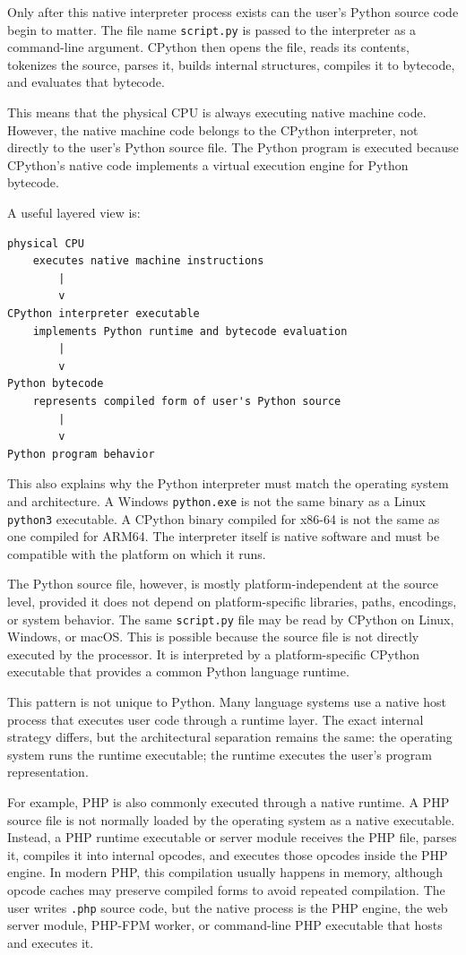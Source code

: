 \documentclass[a4paper,twoside]{report}
\begin{document}
Only after this native interpreter process exists can the user's Python source code begin to matter. The file name \texttt{script.py} is passed to the interpreter as a command-line argument. CPython then opens the file, reads its contents, tokenizes the source, parses it, builds internal structures, compiles it to bytecode, and evaluates that bytecode.

This means that the physical CPU is always executing native machine code. However, the native machine code belongs to the CPython interpreter, not directly to the user's Python source file. The Python program is executed because CPython's native code implements a virtual execution engine for Python bytecode.

A useful layered view is:

\begin{verbatim}
physical CPU
    executes native machine instructions
        |
        v
CPython interpreter executable
    implements Python runtime and bytecode evaluation
        |
        v
Python bytecode
    represents compiled form of user's Python source
        |
        v
Python program behavior
\end{verbatim}

This also explains why the Python interpreter must match the operating system and architecture. A Windows \texttt{python.exe} is not the same binary as a Linux \texttt{python3} executable. A CPython binary compiled for x86-64 is not the same as one compiled for ARM64. The interpreter itself is native software and must be compatible with the platform on which it runs.

The Python source file, however, is mostly platform-independent at the source level, provided it does not depend on platform-specific libraries, paths, encodings, or system behavior. The same \texttt{script.py} file may be read by CPython on Linux, Windows, or macOS. This is possible because the source file is not directly executed by the processor. It is interpreted by a platform-specific CPython executable that provides a common Python language runtime.

This pattern is not unique to Python. Many language systems use a native host process that executes user code through a runtime layer. The exact internal strategy differs, but the architectural separation remains the same: the operating system runs the runtime executable; the runtime executes the user's program representation.

For example, PHP is also commonly executed through a native runtime. A PHP source file is not normally loaded by the operating system as a native executable. Instead, a PHP runtime executable or server module receives the PHP file, parses it, compiles it into internal opcodes, and executes those opcodes inside the PHP engine. In modern PHP, this compilation usually happens in memory, although opcode caches may preserve compiled forms to avoid repeated compilation. The user writes \texttt{.php} source code, but the native process is the PHP engine, the web server module, PHP-FPM worker, or command-line PHP executable that hosts and executes it.
\end{document}
